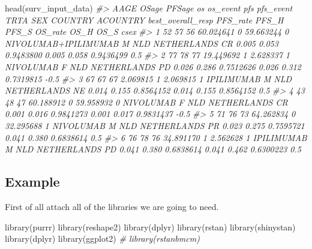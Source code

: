\documentclass[
]{article}
\newenvironment{Shaded}{\begin{snugshade}}{\end{snugshade}}
\newcommand{\CommentTok}[1]{\textcolor[rgb]{0.56,0.35,0.01}{\textit{#1}}}
\newcommand{\FunctionTok}[1]{\textcolor[rgb]{0.00,0.00,0.00}{#1}}
\newcommand{\NormalTok}[1]{#1}
\begin{document}
\begin{Shaded}
\begin{Highlighting}[]
\FunctionTok{head}\NormalTok{(surv\_input\_data)}
\CommentTok{\#\textgreater{}   AAGE OSage PFSage        os os\_event       pfs pfs\_event                 TRTA SEX COUNTRY    ACOUNTRY best\_overall\_resp PFS\_rate PFS\_H     PFS\_S OS\_rate  OS\_H      OS\_S csex}
\CommentTok{\#\textgreater{} 1   52    57     56 60.024641        0 59.663244         0 NIVOLUMAB+IPILIMUMAB   M     NLD NETHERLANDS                CR    0.005 0.053 0.9483800   0.005 0.058 0.9436499  0.5}
\CommentTok{\#\textgreater{} 2   77    78     77 19.449692        1  2.628337         1            NIVOLUMAB   F     NLD NETHERLANDS                PD    0.026 0.286 0.7512626   0.026 0.312 0.7319815 {-}0.5}
\CommentTok{\#\textgreater{} 3   67    67     67  2.069815        1  2.069815         1           IPILIMUMAB   M     NLD NETHERLANDS                NE    0.014 0.155 0.8564152   0.014 0.155 0.8564152  0.5}
\CommentTok{\#\textgreater{} 4   43    48     47 60.188912        0 59.958932         0            NIVOLUMAB   F     NLD NETHERLANDS                CR    0.001 0.016 0.9841273   0.001 0.017 0.9831437 {-}0.5}
\CommentTok{\#\textgreater{} 5   71    76     73 64.262834        0 32.295688         1            NIVOLUMAB   M     NLD NETHERLANDS                PR    0.023 0.275 0.7595721   0.041 0.380 0.6838614  0.5}
\CommentTok{\#\textgreater{} 6   76    78     76 34.891170        1  2.562628         1           IPILIMUMAB   M     NLD NETHERLANDS                PD    0.041 0.380 0.6838614   0.041 0.462 0.6300223  0.5}
\end{Highlighting}
\end{Shaded}

\hypertarget{example}{%
\subsection{Example}\label{example}}

First of all attach all of the libraries we are going to need.

\begin{Shaded}
\begin{Highlighting}[]
\FunctionTok{library}\NormalTok{(purrr)}
\FunctionTok{library}\NormalTok{(reshape2)}
\FunctionTok{library}\NormalTok{(dplyr)}
\FunctionTok{library}\NormalTok{(rstan)}
\FunctionTok{library}\NormalTok{(shinystan)}
\FunctionTok{library}\NormalTok{(dplyr)}
\FunctionTok{library}\NormalTok{(ggplot2)}
\CommentTok{\# library(rstanbmcm)}
\end{Highlighting}
\end{Shaded}
\end{document}
